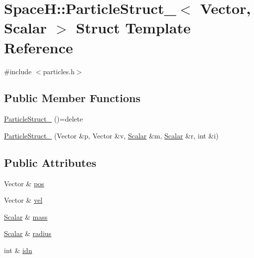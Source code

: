 \hypertarget{struct_space_h_1_1_particle_struct__}{}\section{SpaceH\+:\+:Particle\+Struct\+\_\+$<$ Vector, Scalar $>$ Struct Template Reference}
\label{struct_space_h_1_1_particle_struct__}


{\ttfamily \#include $<$particles.\+h$>$}

\subsection*{Public Member Functions}
\begin{DoxyCompactItemize}
\item 
\mbox{\hyperlink{struct_space_h_1_1_particle_struct___a914d98d694408caea1d64403ac7f696f}{Particle\+Struct\+\_\+}} ()=delete
\item 
\mbox{\hyperlink{struct_space_h_1_1_particle_struct___a6a9d0158da7c8be6ff40053981e112b6}{Particle\+Struct\+\_\+}} (Vector \&p, Vector \&v, \mbox{\hyperlink{create_kepler_8cpp_a8c2981f3f834be9448a6ab06c28748eb}{Scalar}} \&m, \mbox{\hyperlink{create_kepler_8cpp_a8c2981f3f834be9448a6ab06c28748eb}{Scalar}} \&r, int \&i)
\end{DoxyCompactItemize}
\subsection*{Public Attributes}
\begin{DoxyCompactItemize}
\item 
Vector \& \mbox{\hyperlink{struct_space_h_1_1_particle_struct___a611eb4fe7fba3e1b6615322399627b25}{pos}}
\item 
Vector \& \mbox{\hyperlink{struct_space_h_1_1_particle_struct___a110dd25faafb71a22e076a133cd6d547}{vel}}
\item 
\mbox{\hyperlink{create_kepler_8cpp_a8c2981f3f834be9448a6ab06c28748eb}{Scalar}} \& \mbox{\hyperlink{struct_space_h_1_1_particle_struct___a51b155f67fbf98f5cf0dbf1231ad0d5f}{mass}}
\item 
\mbox{\hyperlink{create_kepler_8cpp_a8c2981f3f834be9448a6ab06c28748eb}{Scalar}} \& \mbox{\hyperlink{struct_space_h_1_1_particle_struct___aeae3107d6a3a33fbcfe323eb54c4b5ec}{radius}}
\item 
int \& \mbox{\hyperlink{struct_space_h_1_1_particle_struct___a4e1ffe43fb4118732fb301cd6029712e}{idn}}
\end{DoxyCompactItemize}


